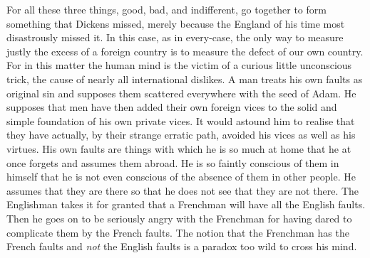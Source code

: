 \documentclass{book}
\begin{document}
For all these three things, good, bad, and indifferent, go together to form something that Dickens missed, merely because the England of his time most disastrously missed it. In this case, as in every-case, the only way to measure justly the excess of a foreign country is to measure the defect of our own country. For in this matter the human mind is the victim of a curious little unconscious trick, the cause of nearly all international dislikes. A man treats his own faults as original sin and supposes them scattered everywhere with the seed of Adam. He supposes that men have then added their own foreign vices to the solid and simple foundation of his own private vices. It would astound him to realise that they have actually, by their strange erratic path, avoided his vices as well as his virtues. His own faults are things with which he is so much at home that he at once forgets and assumes them abroad. He is so faintly conscious of them in himself that he is not even conscious of the absence of them in other people. He assumes that they are there so that he does not see that they are not there. The Englishman takes it for granted that a Frenchman will have all the English faults. Then he goes on to be seriously angry with the Frenchman for having dared to complicate them by the French faults. The notion that the Frenchman has the French faults and \emph{not} the English faults is a paradox too wild to cross his mind.
\end{document}
